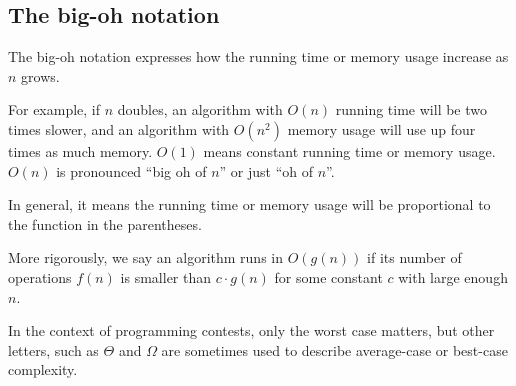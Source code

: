 \subsection{The big-oh notation}

The big-oh notation expresses how the running time or memory usage increase
as $n$ grows.

For example, if $n$ doubles, an algorithm with $O(n)$ running time will be two
times slower, and an algorithm with $O(n^2)$ memory usage will use up four
times as much memory.
$O(1)$ means constant running time or memory usage.
$O(n)$ is pronounced ``big oh of $n$'' or just ``oh of $n$''.

In general, it means the running time or memory usage will be
proportional to the function in the parentheses.

More rigorously, we say an algorithm runs in $O(g(n))$
if its number of operations $f(n)$ is smaller than $c\cdot g(n)$
for some constant $c$ with large enough $n$.

In the context of programming contests, only the worst case matters,
but other letters, such as $\Theta$ and $\Omega$ are sometimes used to describe
average-case or best-case complexity.
